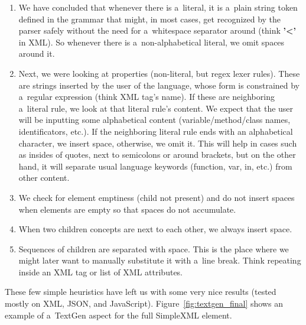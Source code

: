 \begin{enumerate}
	\item We have concluded that whenever there is a~literal, it is a~plain string token defined in the grammar that might, in most cases, get recognized by the parser safely without the need for a~whitespace separator around (think \textbf{'\textless'} in XML).
	So whenever there is a~non-alphabetical literal, we omit spaces around it.

	\item Next, we were looking at properties (non-literal, but regex lexer rules).
	These are strings inserted by the user of the language, whose form is constrained by a~regular expression (think XML tag's name).
	If these are neighboring a~literal rule, we look at that literal rule's content.
	We expect that the user will be inputting some alphabetical content (variable/method/class names, identificators, etc.).
	If the neighboring literal rule ends with an alphabetical character, we insert space, otherwise, we omit it.
	This will help in cases such as insides of quotes, next to semicolons or around brackets, but on the other hand, it will separate usual language keywords (function, var, in, etc.) from other content.

	\item We check for element emptiness (child not present) and do not insert spaces when elements are empty so that spaces do not accumulate.

	\item When two children concepts are next to each other, we always insert space.

	\item Sequences of children are separated with space.
	This is the place where we might later want to manually substitute it with a~line break.
	Think repeating  inside an XML tag or list of XML attributes.
\end{enumerate}

These few simple heuristics have left us with some very nice results (tested mostly on XML, JSON, and JavaScript). Figure~\ref{fig:textgen_final} shows an example of a~TextGen aspect for the full SimpleXML element.
\\

